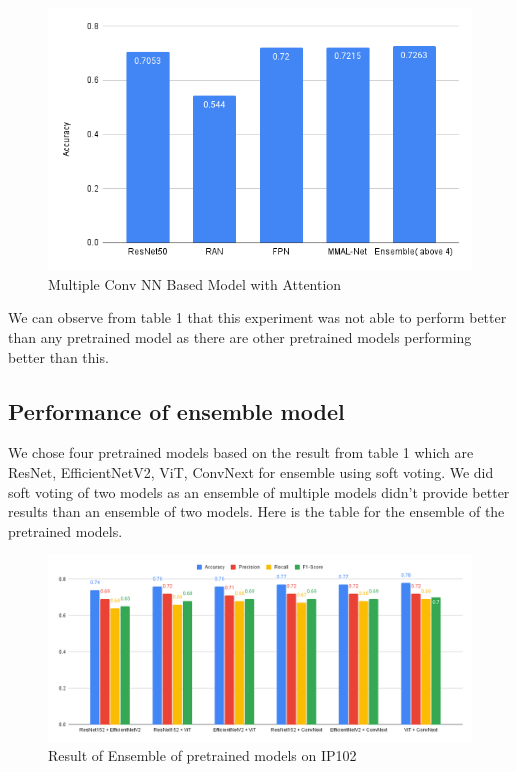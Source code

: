 \begin{figure}
    \centering
    \includegraphics[scale=.65]{figures/chart (4).png}
    \caption{Multiple Conv NN Based Model with Attention}
    \label{fig:my_label}
\end{figure}


We can observe from table 1 that this experiment was not able to perform better than any pretrained model as there are other pretrained models performing better than this.

\subsection{Performance of ensemble model}
We chose four pretrained models based on the result from table 1 which are ResNet, EfficientNetV2, ViT, ConvNext for ensemble using soft voting. We did soft voting of two models as an ensemble of multiple models didn’t provide better results than an ensemble of two models. Here is the table for the ensemble of the pretrained models.\\
\begin{figure}
    \centering
    \includegraphics[scale=.7]{figures/chart (5).png}
    \caption{Result of Ensemble of pretrained models on IP102}
    \label{fig:ensemble_result}
\end{figure}


